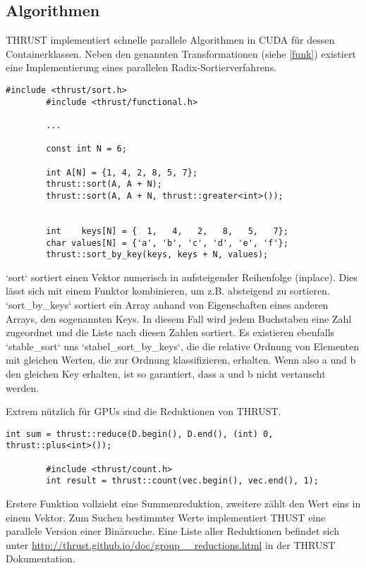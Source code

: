 		\subsection{Algorithmen}\label{algo}
		THRUST implementiert schnelle parallele Algorithmen in CUDA für dessen Containerklassen. Neben den genannten Transformationen (siehe \ref{funk}) existiert eine Implementierung eines parallelen Radix-Sortierverfahrens.
		\begin{lstlisting}[caption=THRUST Sortieren]	
		#include <thrust/sort.h>
		#include <thrust/functional.h>
		
		...
		
		const int N = 6;
		
		int A[N] = {1, 4, 2, 8, 5, 7};
		thrust::sort(A, A + N);
		thrust::sort(A, A + N, thrust::greater<int>());


		int    keys[N] = {  1,   4,   2,   8,   5,   7};
		char values[N] = {'a', 'b', 'c', 'd', 'e', 'f'};
		thrust::sort_by_key(keys, keys + N, values);
		\end{lstlisting}
		
		\li`sort` sortiert einen Vektor numerisch in aufsteigender Reihenfolge (inplace). Dies lässt sich mit einem Funktor kombinieren, um z.B. absteigend zu sortieren. \li`sort_by_keys` sortiert ein Array anhand von Eigenschaften eines anderen Arrays, den sogenannten Keys. In diesem Fall wird jedem Buchstaben eine Zahl zugeordnet und die Liste nach diesen Zahlen sortiert. Es existieren ebenfalls \li`stable_sort` uns \li`stabel_sort_by_keys`, die die relative Ordnung von Elementen mit gleichen Werten, die zur Ordnung klassifizieren, erhalten. Wenn also a und b den gleichen Key erhalten, ist so garantiert, dass a und b nicht vertauscht werden.
		
		\newpage
		Extrem nützlich für GPUs sind die Reduktionen von THRUST.
		\begin{lstlisting}[caption=THRUST Reduktionen]
		int sum = thrust::reduce(D.begin(), D.end(), (int) 0, thrust::plus<int>());
		
		#include <thrust/count.h>
		int result = thrust::count(vec.begin(), vec.end(), 1);
		\end{lstlisting}
		
		Erstere Funktion vollzieht eine Summenreduktion, zweitere zählt den Wert eins in einem Vektor. Zum Suchen bestimmter Werte implementiert THUST eine parallele Version einer Binärsuche. Eine Liste aller Reduktionen befindet sich unter \url{http://thrust.github.io/doc/group__reductions.html} in der THRUST Dokumentation. \autocite{thrustDoc}
		
